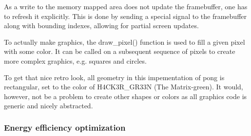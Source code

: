 As a write to the memory mapped area does not update the framebuffer,
one has to refresh it explicitly.
This is done by sending a special signal to the framebuffer
along with bounding indexes, allowing for partial screen updates.

To actually make graphics,
the draw\_pixel() function is used to fill a given pixel with some color.
It can be called on a subsequent sequence of pixels to create more complex graphics,
e.g. squares and circles.

To get that nice retro look, all geometry in this impementation of pong is rectangular,
set to the color of H4CK3R\_GR33N (The Matrix-green).
It would, however, not be a problem to create other shapes or colors as
all graphics code is generic and nicely abstracted.

\subsubsection{Energy efficiency optimization}

